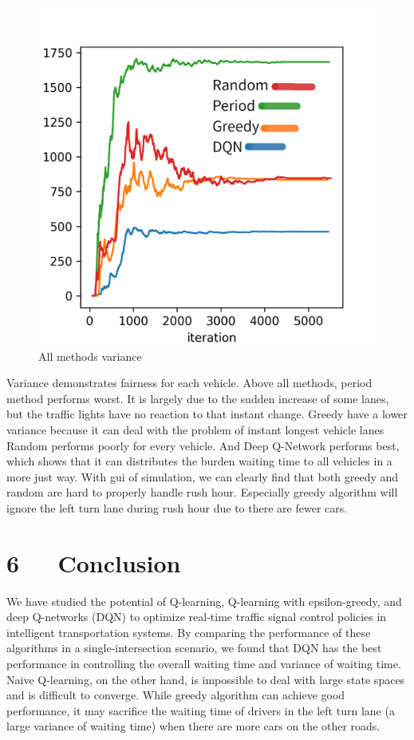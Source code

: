 \documentclass[letterpaper]{article} %
\begin{document}
\begin{figure}[h]
	\centering
	\includegraphics[width=0.75\linewidth]{variance.png}
	\caption{All methods variance}
	\label{fig:variance}
\end{figure}

Variance demonstrates fairness for each vehicle. Above all methods, period method performs worst. It is largely due to the sudden increase of some lanes, but the traffic lights have no reaction to that instant change. Greedy have a lower variance because it can deal with the problem of instant longest vehicle lanes Random performs poorly for every vehicle. And Deep Q-Network performs best, which shows that it can distributes the burden waiting time to all vehicles in a more just way. With gui of simulation, we can clearly find that both greedy and random are hard to properly handle rush hour. Especially greedy algorithm will ignore the left turn lane during rush hour due to there are fewer cars.

\section{6\ \ \ Conclusion}
\hspace*{1em}We have studied the potential of Q-learning, Q-learning with epsilon-greedy, and deep Q-networks (DQN) to optimize real-time traffic signal control policies in intelligent transportation systems. By comparing the performance of these algorithms in a single-intersection scenario, we found that DQN has the best performance in controlling the overall waiting time and variance of waiting time. Naive Q-learning, on the other hand, is impossible to deal with large state spaces and is difficult to converge. While greedy algorithm can achieve good performance, it may sacrifice the waiting time of drivers in the left turn lane (a large variance of waiting time) when there are more cars on the other roads.
\end{document}
